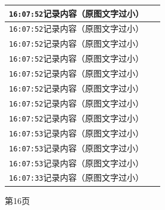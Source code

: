 \documentclass[UTF8,10pt,a4paper,fontset=fandol]{ctexart}
\newcommand{\fieldvalue}[1]{#1}
\begin{document}
\begin{minipage}[t]{0.48\linewidth}
\begin{tabular}{|p{0.20\linewidth}|p{0.72\linewidth}|}
\multicolumn{2}{|l|}{
\fieldvalue{\texttt{16:07:52}\quad 记录内容（原图文字过小）}} \\ \hline
\multicolumn{2}{|l|}{
\fieldvalue{\texttt{16:07:52}\quad 记录内容（原图文字过小）}} \\ \hline
\multicolumn{2}{|l|}{
\fieldvalue{\texttt{16:07:52}\quad 记录内容（原图文字过小）}} \\ \hline
\multicolumn{2}{|l|}{
\fieldvalue{\texttt{16:07:52}\quad 记录内容（原图文字过小）}} \\ \hline
\multicolumn{2}{|l|}{
\fieldvalue{\texttt{16:07:52}\quad 记录内容（原图文字过小）}} \\ \hline
\multicolumn{2}{|l|}{
\fieldvalue{\texttt{16:07:52}\quad 记录内容（原图文字过小）}} \\ \hline
\multicolumn{2}{|l|}{
\fieldvalue{\texttt{16:07:52}\quad 记录内容（原图文字过小）}} \\ \hline
\multicolumn{2}{|l|}{
\fieldvalue{\texttt{16:07:52}\quad 记录内容（原图文字过小）}} \\ \hline
\multicolumn{2}{|l|}{
\fieldvalue{\texttt{16:07:53}\quad 记录内容（原图文字过小）}} \\ \hline
\multicolumn{2}{|l|}{
\fieldvalue{\texttt{16:07:53}\quad 记录内容（原图文字过小）}} \\ \hline
\multicolumn{2}{|l|}{
\fieldvalue{\texttt{16:07:53}\quad 记录内容（原图文字过小）}} \\ \hline
\multicolumn{2}{|l|}{
\fieldvalue{\texttt{16:07:33}\quad 记录内容（原图文字过小）}} \\ \hline
\end{tabular}

\vspace{2pt}
第16页
\end{minipage}

\vfill
\end{document}

